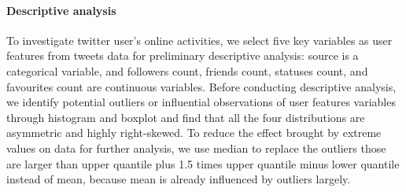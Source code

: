 \documentclass[]{article}
\newenvironment{Shaded}{\begin{snugshade}}{\end{snugshade}}
\newcommand{\CommentTok}[1]{\textcolor[rgb]{0.56,0.35,0.01}{\textit{#1}}}
\newcommand{\DataTypeTok}[1]{\textcolor[rgb]{0.13,0.29,0.53}{#1}}
\newcommand{\DecValTok}[1]{\textcolor[rgb]{0.00,0.00,0.81}{#1}}
\newcommand{\KeywordTok}[1]{\textcolor[rgb]{0.13,0.29,0.53}{\textbf{#1}}}
\newcommand{\NormalTok}[1]{#1}
\newcommand{\OperatorTok}[1]{\textcolor[rgb]{0.81,0.36,0.00}{\textbf{#1}}}
\newcommand{\OtherTok}[1]{\textcolor[rgb]{0.56,0.35,0.01}{#1}}
\newcommand{\StringTok}[1]{\textcolor[rgb]{0.31,0.60,0.02}{#1}}
\let\oldparagraph\paragraph
\renewcommand{\paragraph}[1]{\oldparagraph{#1}\mbox{}}
\begin{document}
\begin{Shaded}
\end{Shaded}

\hypertarget{descriptive-analysis}{%
\paragraph{Descriptive analysis}\label{descriptive-analysis}}

To investigate twitter user's online activities, we select five key
variables as user features from tweets data for preliminary descriptive
analysis: source is a categorical variable, and followers count, friends
count, statuses count, and favourites count are continuous variables.
Before conducting descriptive analysis, we identify potential outliers
or influential observations of user features variables through histogram
and boxplot and find that all the four distributions are asymmetric and
highly right-skewed. To reduce the effect brought by extreme values on
data for further analysis, we use median to replace the outliers those
are larger than upper quantile plus 1.5 times upper quantile minus lower
quantile instead of mean, because mean is already influenced by outliers
largely.
\end{document}
